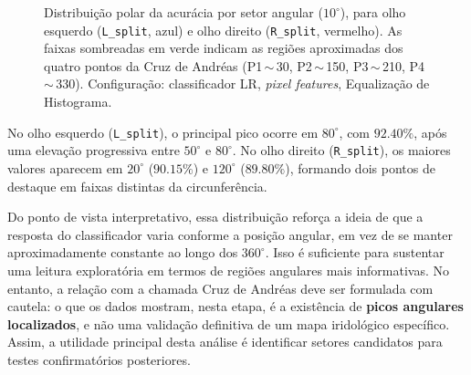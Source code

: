 \documentclass[11pt,a4paper]{article}
\begin{document}
\begin{figure}[H]
    \caption{Distribuição polar da acurácia por setor angular (\(10^\circ\)), para olho esquerdo (\texttt{L\_split}, azul) e olho direito (\texttt{R\_split}, vermelho). As faixas sombreadas em verde indicam as regiões aproximadas dos quatro pontos da Cruz de Andréas (P1\,$\sim$\,30\textdegree, P2\,$\sim$\,150\textdegree, P3\,$\sim$\,210\textdegree, P4\,$\sim$\,330\textdegree). Configuração: classificador LR, \textit{pixel features}, Equalização de Histograma.}
    \label{fig:polar-angular}
\end{figure}

No olho esquerdo (\texttt{L\_split}), o principal pico ocorre em \(80^\circ\), com \(92.40\%\), após uma elevação progressiva entre \(50^\circ\) e \(80^\circ\). No olho direito (\texttt{R\_split}), os maiores valores aparecem em \(20^\circ\) (\(90.15\%\)) e \(120^\circ\) (\(89.80\%\)), formando dois pontos de destaque em faixas distintas da circunferência.

Do ponto de vista interpretativo, essa distribuição reforça a ideia de que a resposta do classificador varia conforme a posição angular, em vez de se manter aproximadamente constante ao longo dos \(360^\circ\). Isso é suficiente para sustentar uma leitura exploratória em termos de regiões angulares mais informativas. No entanto, a relação com a chamada Cruz de Andréas deve ser formulada com cautela: o que os dados mostram, nesta etapa, é a existência de \textbf{picos angulares localizados}, e não uma validação definitiva de um mapa iridológico específico. Assim, a utilidade principal desta análise é identificar setores candidatos para testes confirmatórios posteriores.
\end{document}

